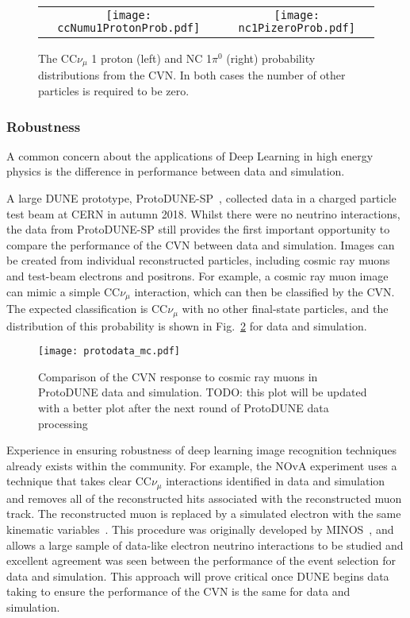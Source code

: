 \begin{figure}
    \centering
    \begin{tabular}{cc}
		\texttt{[image: ccNumu1ProtonProb.pdf]} &
		\texttt{[image: nc1PizeroProb.pdf]}
	\end{tabular}
	\caption{The CC$\nu_\mu$ 1 proton (left) and NC 1$\pi^0$ (right) probability distributions from the CVN. In both cases the number of other particles is required to be zero.}
    \label{fig:exclusive}
\end{figure}

\subsubsection{Robustness}
A common concern about the applications of Deep Learning in high energy physics is the difference in performance between data and simulation. 

A large DUNE prototype, ProtoDUNE-SP~\cite{Abi:2017aow}, collected data in a charged particle test beam at CERN in autumn 2018. Whilst there were no neutrino interactions, the data from ProtoDUNE-SP still provides the first important opportunity to compare the performance of the CVN between data and simulation. Images can be created from individual reconstructed particles, including cosmic ray muons and test-beam electrons and positrons. For example, a cosmic ray muon image
can mimic a simple CC$\nu_\mu$ interaction, which can then be classified by the CVN. The expected classification is CC$\nu_\mu$ with no other final-state particles, and the distribution of this probability is shown in Fig.~\ref{fig:protodunecvn} for data and simulation.

\begin{figure}
    \centering
    \texttt{[image: protodata\_mc.pdf]}
    \caption{Comparison of the CVN response to cosmic ray muons in ProtoDUNE data and simulation. TODO: this plot will be updated with a better plot after the next round of ProtoDUNE data processing}
    \label{fig:protodunecvn}
\end{figure}

Experience in ensuring robustness of deep learning image recognition techniques already exists within the community. For example, the NOvA experiment uses a technique that takes clear CC$\nu_\mu$ interactions identified in data and simulation and removes all of the reconstructed hits associated with the reconstructed muon track. The reconstructed muon is replaced by a simulated electron with the same kinematic variables~\cite{NOvA_MRE}. This procedure was originally developed by MINOS~\cite{MINOS_MRE}, and allows a large sample of data-like electron neutrino interactions to be studied and excellent agreement was seen between the performance of the event selection for data and simulation. This approach will prove critical once DUNE begins data taking to ensure the performance of the CVN is the same for data and simulation.
